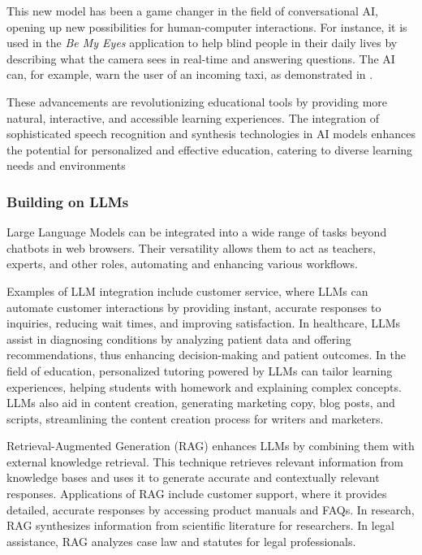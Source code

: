 \documentclass{article}
\begin{document}
This new model has been a game changer in the field of conversational
AI, opening up new possibilities for human-computer interactions.
For instance, it is used in the \textit{Be My Eyes} \cite{bemyeyes} application to
help blind people in their daily lives by describing what
the camera sees in real-time and answering questions.
The AI can, for example, warn the user of an incoming taxi,
as demonstrated in \cite{youtube_bemyeyes_gpt4o}.

These advancements are revolutionizing educational tools by providing more natural, interactive, and accessible learning experiences. The integration of sophisticated speech recognition and synthesis technologies in AI models enhances the potential for personalized and effective education, catering to diverse learning needs and environments



\subsubsection{Building on LLMs}

Large Language Models can be integrated into a wide range of
tasks beyond chatbots in web browsers. Their versatility allows
them to act as teachers, experts, and other roles, automating
and enhancing various workflows.

Examples of LLM integration include customer service,
where LLMs can automate customer interactions by providing instant, accurate responses to inquiries,
reducing wait times, and improving satisfaction. In healthcare, LLMs assist
in diagnosing conditions by analyzing patient data and offering
recommendations, thus enhancing decision-making and patient outcomes.
In the field of education, personalized tutoring powered by LLMs
can tailor learning experiences, helping students
with homework and explaining complex concepts. LLMs also aid
in content creation, generating marketing copy, blog posts,
and scripts, streamlining the content creation process for
writers and marketers.

Retrieval-Augmented Generation (RAG) enhances LLMs by combining
them with external knowledge retrieval. This technique retrieves relevant
information from knowledge bases and uses it to generate accurate
and contextually relevant responses. Applications of RAG include
customer support, where it provides detailed, accurate responses
by accessing product manuals and FAQs. In research, RAG synthesizes
information from scientific literature for researchers.
In legal assistance, RAG analyzes case law and statutes
for legal professionals. \cite{gao2024retrievalaugmented}
\end{document}
